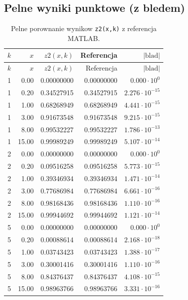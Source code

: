 \documentclass[12pt,a4paper]{article}
\begin{document}
\subsection*{Pelne wyniki punktowe (z bledem)}
\begin{longtable}{rrrrr}
  \caption{Pelne porownanie wynikow \texttt{z2(x,k)} z referencja MATLAB.}\\
  \toprule
  $k$ & $x$ & $z2(x,k)$ & Referencja & $|\text{blad}|$ \\
  \midrule
  \endfirsthead

  \toprule
  $k$ & $x$ & $z2(x,k)$ & Referencja & $|\text{blad}|$ \\
  \midrule
  \endhead

  \bottomrule
  \endfoot

  1 & 0.00  & 0.00000000 & 0.00000000 & $0.000\cdot10^{0}$ \\
  1 & 0.20  & 0.34527915 & 0.34527915 & $2.276\cdot10^{-15}$ \\
  1 & 1.00  & 0.68268949 & 0.68268949 & $4.441\cdot10^{-15}$ \\
  1 & 3.00  & 0.91673548 & 0.91673548 & $9.215\cdot10^{-15}$ \\
  1 & 8.00  & 0.99532227 & 0.99532227 & $1.786\cdot10^{-13}$ \\
  1 & 15.00 & 0.99989249 & 0.99989249 & $5.107\cdot10^{-14}$ \\

  2 & 0.00  & 0.00000000 & 0.00000000 & $0.000\cdot10^{0}$ \\
  2 & 0.20  & 0.09516258 & 0.09516258 & $5.773\cdot10^{-15}$ \\
  2 & 1.00  & 0.39346934 & 0.39346934 & $1.471\cdot10^{-14}$ \\
  2 & 3.00  & 0.77686984 & 0.77686984 & $6.661\cdot10^{-16}$ \\
  2 & 8.00  & 0.98168436 & 0.98168436 & $1.110\cdot10^{-16}$ \\
  2 & 15.00 & 0.99944692 & 0.99944692 & $1.121\cdot10^{-14}$ \\

  5 & 0.00  & 0.00000000 & 0.00000000 & $0.000\cdot10^{0}$ \\
  5 & 0.20  & 0.00088614 & 0.00088614 & $2.168\cdot10^{-18}$ \\
  5 & 1.00  & 0.03743423 & 0.03743423 & $1.388\cdot10^{-17}$ \\
  5 & 3.00  & 0.30001416 & 0.30001416 & $1.110\cdot10^{-16}$ \\
  5 & 8.00  & 0.84376437 & 0.84376437 & $4.108\cdot10^{-15}$ \\
  5 & 15.00 & 0.98963766 & 0.98963766 & $3.331\cdot10^{-16}$ \\


\end{longtable}
\end{document}

